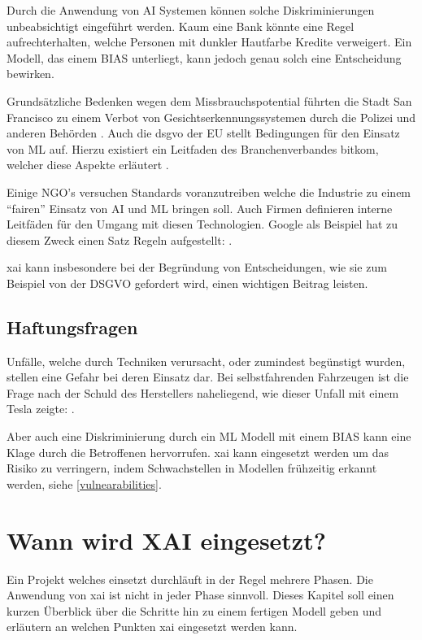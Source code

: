 \documentclass[
  12pt, %
  a4paper, %
  oneside, %
  openany, 
  numbers=noenddot, %
  BCOR=5mm, %
  parskip=half*, %
  thesis, %
]{bfhbook}
\begin{document}
Durch die Anwendung von \Gls{AI} Systemen können solche Diskriminierungen unbeabsichtigt eingeführt werden. Kaum eine Bank könnte eine Regel aufrechterhalten, welche Personen mit dunkler Hautfarbe Kredite verweigert. Ein Modell, das einem \Gls{BIAS} unterliegt, kann jedoch genau solch eine Entscheidung bewirken.

Grundsätzliche Bedenken wegen dem Missbrauchspotential  führten die Stadt San Francisco zu einem Verbot von Gesichtserkennungssystemen durch die Polizei und anderen Behörden \parencite{nyTimes}. Auch die \Gls{dsgvo} der EU stellt Bedingungen für den Einsatz von \Gls{ML} auf. Hierzu existiert ein Leitfaden des Branchenverbandes bitkom, welcher diese Aspekte erläutert \parencite{bitkom}.

Einige NGO's versuchen Standards voranzutreiben welche die Industrie zu einem ``fairen'' Einsatz von \Gls{AI} und \Gls{ML} bringen soll. Auch Firmen definieren interne Leitfäden für den Umgang mit diesen Technologien. Google als Beispiel  hat zu diesem Zweck einen Satz Regeln aufgestellt: \parencite{aiGoogle}.

\Gls{xai} kann insbesondere bei der Begründung von Entscheidungen, wie sie zum Beispiel von der \acrshort{DSGVO} gefordert wird, einen wichtigen Beitrag leisten.

\section{Haftungsfragen}
Unfälle, welche durch  Techniken verursacht, oder zumindest begünstigt wurden, stellen eine Gefahr bei deren Einsatz dar. Bei selbstfahrenden Fahrzeugen ist die Frage nach der Schuld des Herstellers naheliegend, wie dieser Unfall mit einem Tesla zeigte: \parencite{teslaCrash}. 

Aber auch eine Diskriminierung durch ein \Gls{ML} Modell mit einem \Gls{BIAS} kann eine Klage durch die Betroffenen hervorrufen. \Gls{xai} kann eingesetzt werden um das Risiko zu verringern, indem Schwachstellen in Modellen frühzeitig erkannt werden, siehe \ref{vulnearabilities}. 

\chapter{Wann wird XAI eingesetzt?}
Ein Projekt welches  einsetzt durchläuft in der Regel mehrere Phasen. Die Anwendung von \Gls{xai} ist nicht in jeder Phase sinnvoll. Dieses Kapitel soll einen kurzen Überblick über die Schritte hin zu einem fertigen Modell geben und erläutern an welchen Punkten \Gls{xai} eingesetzt werden kann.
\end{document}
